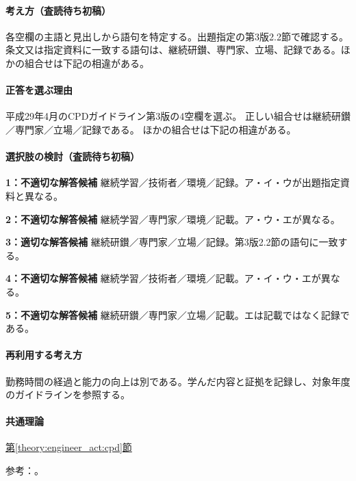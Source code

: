 \paragraph{考え方（査読待ち初稿）} 各空欄の主語と見出しから語句を特定する。出題指定の第3版2.2節で確認する。 条文又は指定資料に一致する語句は、継続研鑚、専門家、立場、記録である。ほかの組合せは下記の相違がある。

\paragraph{正答を選ぶ理由} 平成29年4月のCPDガイドライン第3版の4空欄を選ぶ。 正しい組合せは継続研鑚／専門家／立場／記録である。 ほかの組合せは下記の相違がある。

\paragraph{選択肢の検討（査読待ち初稿）}

\noindent\textbf{1：不適切な解答候補} 継続学習／技術者／環境／記録。ア・イ・ウが出題指定資料と異なる。\par

\noindent\textbf{2：不適切な解答候補} 継続学習／専門家／環境／記載。ア・ウ・エが異なる。\par

\noindent\textbf{3：適切な解答候補} 継続研鑚／専門家／立場／記録。第3版2.2節の語句に一致する。\par

\noindent\textbf{4：不適切な解答候補} 継続学習／技術者／環境／記載。ア・イ・ウ・エが異なる。\par

\noindent\textbf{5：不適切な解答候補} 継続研鑚／専門家／立場／記載。エは記載ではなく記録である。\par

\paragraph{再利用する考え方} 勤務時間の経過と能力の向上は別である。学んだ内容と証拠を記録し、対象年度のガイドラインを参照する。

\paragraph{共通理論} \hyperref[theory:engineer_act:cpd]{第\ref*{theory:engineer_act:cpd}節}

\par 参考：\cite{cpd_v3}。

